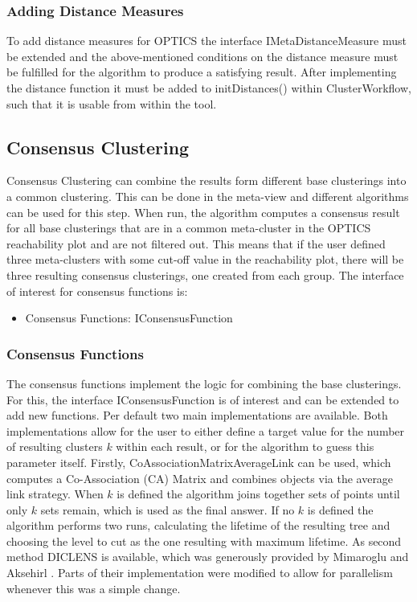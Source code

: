 \documentclass[
	a4paper,
	english,
	twoside,
	openright,               
	11pt                            
	]{report}
\begin{document}
\subsubsection*{Adding Distance Measures}
To add distance measures for OPTICS the interface IMetaDistanceMeasure must be extended and the above-mentioned conditions on the distance measure must be fulfilled for the algorithm to produce a satisfying result. After implementing the distance function it must be added to initDistances() within ClusterWorkflow, such that it is usable from within the tool.

\subsection{Consensus Clustering}
Consensus Clustering can combine the results form different base clusterings into a common clustering. This can be done in the meta-view and different algorithms can be used for this step. When run, the algorithm computes a consensus result for all base clusterings that are in a common meta-cluster in the OPTICS reachability plot and are not filtered out. This means that if the user defined three meta-clusters with some cut-off value in the reachability plot, there will be three resulting consensus clusterings, one created from each group. The interface of interest for consensus functions is:

\begin{itemize}
  \item Consensus Functions: IConsensusFunction
\end{itemize}

\subsubsection{Consensus Functions}
The consensus functions implement the logic for combining the base clusterings. For this, the interface IConsensusFunction is of interest and can be extended to add new functions. Per default two main implementations are available. Both implementations allow for the user to either define a target value for the number of resulting clusters $k$ within each result, or for the algorithm to guess this parameter itself. Firstly, CoAssociationMatrixAverageLink can be used, which computes a Co-Association (CA) Matrix and combines objects via the average link strategy. When $k$ is defined the algorithm joins together sets of points until only $k$ sets remain, which is used as the final answer. If no $k$ is defined the algorithm performs two runs, calculating the lifetime \cite{lifetime} of the resulting tree and choosing the level to cut as the one resulting with maximum lifetime. As second method DICLENS is available, which was generously provided by Mimaroglu and Aksehirl \cite{DICLENS}. Parts of their implementation were modified to allow for parallelism whenever this was a simple change.
\end{document}
